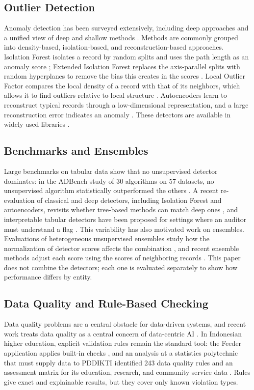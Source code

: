 \documentclass[conference]{IEEEtran}
\begin{document}
\subsection{Outlier Detection}
Anomaly detection has been surveyed extensively, including deep approaches \cite{pang2021deep} and a unified view of deep and shallow methods \cite{ruff2021unifying}. Methods are commonly grouped into density-based, isolation-based, and reconstruction-based approaches. Isolation Forest isolates a record by random splits and uses the path length as an anomaly score \cite{liu2008iforest}; Extended Isolation Forest replaces the axis-parallel splits with random hyperplanes to remove the bias this creates in the scores \cite{hariri2021eif}. Local Outlier Factor compares the local density of a record with that of its neighbors, which allows it to find outliers relative to local structure \cite{breunig2000lof}. Autoencoders learn to reconstruct typical records through a low-dimensional representation, and a large reconstruction error indicates an anomaly \cite{pang2021deep,ruff2021unifying}. These detectors are available in widely used libraries \cite{scikit-learn,chen2024pyod2}.

\subsection{Benchmarks and Ensembles}
Large benchmarks on tabular data show that no unsupervised detector dominates: in the ADBench study of 30 algorithms on 57 datasets, no unsupervised algorithm statistically outperformed the others \cite{han2022adbench}. A recent re-evaluation of classical and deep detectors, including Isolation Forest and autoencoders, revisits whether tree-based methods can match deep ones \cite{mehta2024benchmark}, and interpretable tabular detectors have been proposed for settings where an auditor must understand a flag \cite{chang2023diad}. This variability has also motivated work on ensembles. Evaluations of heterogeneous unsupervised ensembles study how the normalization of detector scores affects the combination \cite{kluttermann2023ensembles}, and recent ensemble methods adjust each score using the scores of neighboring records \cite{yang2024regional}. This paper does not combine the detectors; each one is evaluated separately to show how performance differs by entity.

\subsection{Data Quality and Rule-Based Checking}
Data quality problems are a central obstacle for data-driven systems, and recent work treats data quality as a central concern of data-centric AI \cite{whang2023dataquality,zha2025dcai}. In Indonesian higher education, explicit validation rules remain the standard tool: the Feeder application applies built-in checks \cite{feeder_guide}, and an analysis at a statistics polytechnic that must supply data to PDDIKTI identified 243 data quality rules and an assessment matrix for its education, research, and community service data \cite{sumadi2021dq}. Rules give exact and explainable results, but they cover only known violation types.
\end{document}
